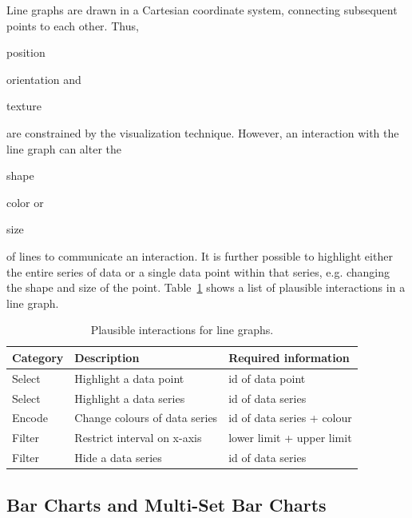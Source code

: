 Line graphs are drawn in a Cartesian coordinate system, connecting subsequent points to each other.
Thus,
\begin{enumerate*}[label=(\arabic*)]
    \item position
    \item orientation and
    \item texture
\end{enumerate*}
are constrained by the visualization technique.
However, an interaction with the line graph can alter the
\begin{enumerate*}[label=(\arabic*)]
    \item shape
    \item color or
    \item size
\end{enumerate*}
of lines to communicate an interaction.
It is further possible to highlight either the entire series of data or a single data point within that series, e.g. changing the shape and size of the point.
Table~\ref{tab:analysis:line-graph:interactions} shows a list of plausible interactions in a line graph.

\begin{table}[H]
  \centering
  \caption{Plausible interactions for line graphs.}%
  \label{tab:analysis:line-graph:interactions}
  \begin{tabularx}{\linewidth}{lXX}
    \bf Category & \bf Description & \bf Required information \\
    \hline
    Select & Highlight a data point & id of data point \\
    Select & Highlight a data series & id of data series \\
    Encode & Change colours of data series & id of data series + colour \\
    Filter & Restrict interval on x-axis & lower limit + upper limit \\
    Filter & Hide a data series & id of data series \\
  \end{tabularx}
\end{table}




\subsection{Bar Charts and Multi-Set Bar Charts}


